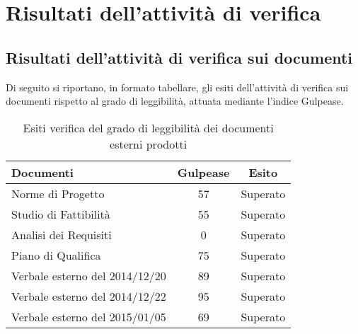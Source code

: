 \section{Risultati dell'attività di verifica}
	\subsection{Risultati dell'attività di verifica sui documenti}
		Di seguito si riportano, in formato tabellare, gli esiti dell'attività di verifica sui documenti rispetto al grado di leggibilità, attuata mediante l'indice Gulpease.
		\begin{table}[H]
					\begin{center}
						\begin{tabular}{| l | c | c |}
							\hline
							Documenti 				& Gulpease	& Esito  \\ \hline
							
							Norme di Progetto 			& 57		& Superato 		 \\
							Studio di Fattibilità 			& 55		& Superato 		 \\
							Analisi dei Requisiti	 			& 0		& Superato 		 \\
							Piano di Qualifica 			& 75		& Superato 	 \\
							Verbale esterno del 2014/12/20 			& 89 		& Superato	\\
							Verbale esterno del 2014/12/22	 	& 95		& Superato 	\\ 
							Verbale esterno del 2015/01/05	& 69		& Superato\\ \hline 
						\end{tabular}
					\end{center}
					\caption{Esiti verifica del grado di leggibilità dei documenti esterni prodotti}
				\end{table}